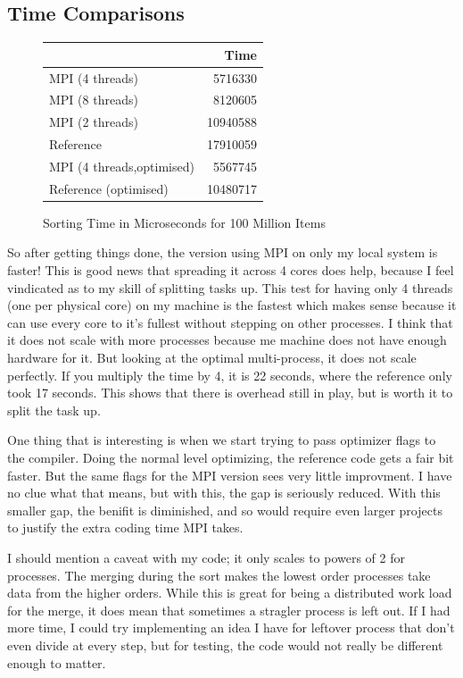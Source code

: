 \documentclass[12pt]{article}
\begin{document}
\subsection{Time Comparisons}

\begin{figure} [ht]
	\centering
	\begin{tabular}{|l|r|}
		\hline
		& Time  \\ \hline
		MPI (4 threads)&5716330 \\ \hline
		MPI (8 threads)&8120605 \\ \hline
		MPI (2 threads)&10940588\\ \hline
		Reference&17910059      \\ \hline
		\hline
		MPI (4 threads,optimised)&5567745 \\ \hline
		Reference (optimised)&10480717\\ \hline
	\end{tabular}
	\caption{Sorting Time in Microseconds for 100 Million Items}
	\label{sorting_time1}
\end{figure}

So after getting things done, the version using MPI on only my local system is faster!
This is good news that spreading it across 4 cores does help, because I feel vindicated as to my skill of splitting tasks up.
This test for having only 4 threads (one per physical core) on my machine is the fastest which makes sense because it can use every core to it's fullest without stepping on other processes.
I think that it does not scale with more processes because me machine does not have enough hardware for it.
But looking at the optimal multi-process, it does not scale perfectly.
If you multiply the time by 4, it is 22 seconds, where the reference only took 17 seconds.
This shows that there is overhead still in play, but is worth it to split the task up.

One thing that is interesting is when we start trying to pass optimizer flags to the compiler.
Doing the normal level optimizing, the reference code gets a fair bit faster.
But the same flags for the MPI version sees very little improvment.
I have no clue what that means, but with this, the gap is seriously reduced.
With this smaller gap, the benifit is diminished, and so would require even larger projects to justify the extra coding time MPI takes.

I should mention a caveat with my code; it only scales to powers of 2 for processes.
The merging during the sort makes the lowest order processes take data from the higher orders.
While this is great for being a distributed work load for the merge, it does mean that sometimes a stragler process is left out.
If I had more time, I could try implementing an idea I have for leftover process that don't even divide at every step, but for testing, the code would not really be different enough to matter.
\end{document}
